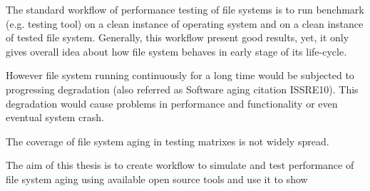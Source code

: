 \documentclass[
  color, %
  table, %
  lof,   %
  lot,   %
]{fithesis3}
\begin{document}
The standard workflow of performance testing of file systems is to run benchmark (e.g. testing tool) on a clean instance of operating system and on a clean instance of tested file system. Generally, this workflow present good results, yet, it only gives overall idea about how file system behaves in early stage of its life-cycle. 

However file system running continuously for a long time would be subjected to progressing degradation (also referred as Software aging citation ISSRE10). This degradation would cause problems in performance and functionality or even eventual system crash.

The coverage of file system aging in testing matrixes is not widely spread.

The aim of this thesis is to create workflow to simulate and test performance of file system aging using available open source tools and use it to show 










\end{document}
